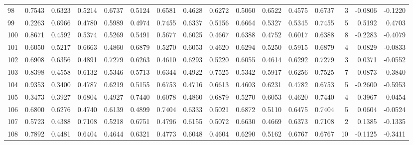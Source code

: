 \begin{tabular}{lrrrrrrrrrrrrrrr}
98  &      0.7543 &  0.6323 &  0.5214 &  0.6737 &  0.5124 &  0.6581 &  0.4628 &  0.6272 &  0.5060 &  0.6522 &   0.4575 &     0.6737 &      3 &                   -0.0806 &                    -0.1220 \\
99  &      0.2263 &  0.6966 &  0.4780 &  0.5989 &  0.4974 &  0.7455 &  0.6337 &  0.5156 &  0.6664 &  0.5327 &   0.5345 &     0.7455 &      5 &                    0.5192 &                     0.4703 \\
100 &      0.8671 &  0.4592 &  0.5374 &  0.5269 &  0.5491 &  0.5677 &  0.6025 &  0.4667 &  0.6388 &  0.4752 &   0.6017 &     0.6388 &      8 &                   -0.2283 &                    -0.4079 \\
101 &      0.6050 &  0.5217 &  0.6663 &  0.4860 &  0.6879 &  0.5270 &  0.6053 &  0.4620 &  0.6294 &  0.5250 &   0.5915 &     0.6879 &      4 &                    0.0829 &                    -0.0833 \\
102 &      0.6908 &  0.6356 &  0.4891 &  0.7279 &  0.6263 &  0.4610 &  0.6293 &  0.5220 &  0.6055 &  0.4614 &   0.6292 &     0.7279 &      3 &                    0.0371 &                    -0.0552 \\
103 &      0.8398 &  0.4558 &  0.6132 &  0.5346 &  0.5713 &  0.6344 &  0.4922 &  0.7525 &  0.5342 &  0.5917 &   0.6256 &     0.7525 &      7 &                   -0.0873 &                    -0.3840 \\
104 &      0.9353 &  0.3400 &  0.4787 &  0.6219 &  0.5155 &  0.6753 &  0.4716 &  0.6613 &  0.4603 &  0.6231 &   0.4782 &     0.6753 &      5 &                   -0.2600 &                    -0.5953 \\
105 &      0.3473 &  0.3927 &  0.6804 &  0.4927 &  0.7440 &  0.6078 &  0.4860 &  0.6879 &  0.5270 &  0.6053 &   0.4620 &     0.7440 &      4 &                    0.3967 &                     0.0454 \\
106 &      0.6800 &  0.6276 &  0.4740 &  0.6139 &  0.4899 &  0.7404 &  0.6333 &  0.5021 &  0.6872 &  0.5110 &   0.6475 &     0.7404 &      5 &                    0.0604 &                    -0.0524 \\
107 &      0.5723 &  0.4388 &  0.7108 &  0.5218 &  0.6751 &  0.4796 &  0.6155 &  0.5072 &  0.6630 &  0.4669 &   0.6373 &     0.7108 &      2 &                    0.1385 &                    -0.1335 \\
108 &      0.7892 &  0.4481 &  0.6404 &  0.4644 &  0.6321 &  0.4773 &  0.6048 &  0.4604 &  0.6290 &  0.5162 &   0.6767 &     0.6767 &     10 &                   -0.1125 &                    -0.3411 \\

\end{tabular}
